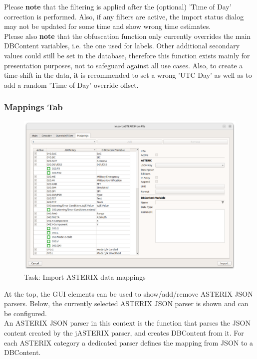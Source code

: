Please \textbf{note} that the filtering is applied after the (optional) 'Time of Day' correction is performed. Also, if any filters are active, the import status dialog may not be updated for some time and show wrong time estimates.
\\

Please also \textbf{note} that the obfuscation function only currently overrides the main DBContent variables, i.e. the one used for labels. Other additional secondary values could still be set in the database, therefore this function exists mainly for presentation purposes, not to safeguard against all use cases. Also, to create a time-shift in the data, it is recommended to set a wrong 'UTC Day' as well as to add a random 'Time of Day' override offset.



\subsubsection{Mappings Tab}

\begin{figure}[H]
  \center
    \hspace*{-0.5cm}
    \includegraphics[width=17cm]{figures/asterix_import_data_mappings.png}
  \caption{Task: Import ASTERIX data mappings}
\end{figure}

At the top, the GUI elements can be used to show/add/remove ASTERIX JSON parsers. Below, the currently selected ASTERIX JSON parser is shown and can be configured. \\

An ASTERIX JSON parser in this context is the function that parses the JSON content created by the jASTERIX parser, and creates DBContent from it. 
For each ASTERIX category a dedicated parser defines the mapping from JSON to a DBContent. \\

